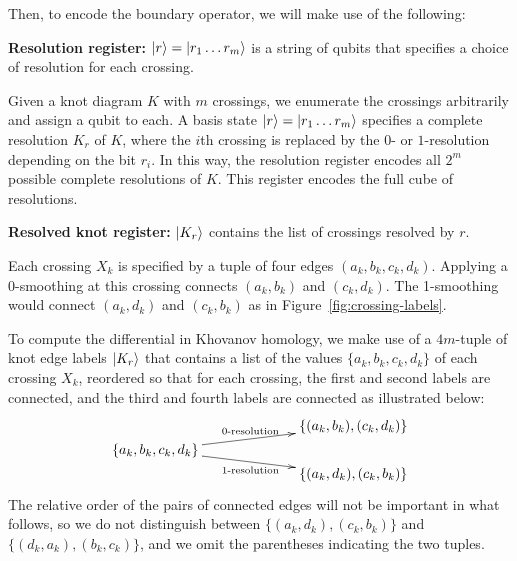 \documentclass[a4paper,onecolumn,unpublished]{quantumarticle}
\theoremstyle{plain}
\theoremstyle{definition}
\theoremstyle{definition}
\numberwithin{equation}{section}
\begin{document}
 
Then, to encode the boundary operator, we will make use of the following:

\smallskip
\noindent \textbf{Resolution register:} $\ket{r} = \ket{r_1 \dots r_m}$ is a string of qubits that specifies a choice of resolution for each crossing.
\smallskip 

Given a knot diagram $K$ with $m$ crossings, we enumerate the crossings arbitrarily and assign a qubit to each. 
A basis state $\ket{r} = \ket{r_1 \dots r_m}$ specifies a complete resolution $K_r$ of $K$, where the $i$th crossing is replaced by the $0$- or $1$-resolution depending on the bit $r_i$. 
In this way, the resolution register encodes all $2^m$ possible complete resolutions of $K$. 
This register encodes the full cube of resolutions.


\smallskip
\noindent \textbf{Resolved knot register:} $\ket{K_r}$ contains the list of crossings resolved by $r$.
\smallskip


Each crossing $X_k$ is specified by a tuple of four edges $(a_k,b_k,c_k,d_k)$. Applying a 0-smoothing at this crossing connects $(a_k,b_k)$ and $(c_k,d_k)$. The 1-smoothing would connect $(a_k,d_k)$ and $(c_k,b_k)$ as in Figure~\ref{fig:crossing-labels}.  
 

To compute the differential in Khovanov homology, we make use of a $4m$-tuple of knot edge labels $\ket{K_r}$ that contains a list of the values $\{a_k,b_k,c_k,d_k\}$ of each crossing $X_k$, reordered so that for each crossing, the first and second labels are connected, and the third and fourth labels are connected as illustrated below:
\[
\xy
 (-30,0)*+{ \{a_k, b_k, c_k, d_k \} }="L"; 
  (20,6)*+{ \{ (a_k, b_k), (c_k, d_k) \} }="T"; 
   (20,-6)*+{ \{ (a_k, d_k),  (c_k, b_k)  \} }="B"; 
    {\ar^{\text{0-resolution} } "L" ;"T"};
    {\ar_{\text{1-resolution} } "L" ;"B"};
\endxy 
\]
The relative order of the pairs of connected edges will not be important in what follows, so we do not distinguish between $\{ (a_k, d_k),  (c_k, b_k)  \}$ and $\{ (d_k, a_k),  (b_k,c_k )  \}$, and we omit the parentheses indicating the two tuples.  
\end{document}
